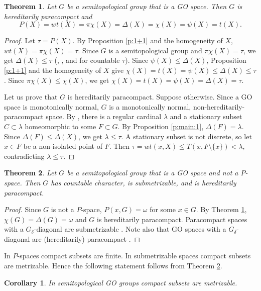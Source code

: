 \documentclass[preprint]{elsarticle}
\def\om{\omega}
\def\la{\lambda}
\def\de{\delta}
\def\sset#1{\{#1\}}
\def\D{\Delta}
\newtheorem{theorem}{Theorem}[section]
\newtheorem{cor}{Corollary}[section]
\theoremstyle{definition}
\theoremstyle{remark}
\begin{document}
\begin{theorem}\label{t:main:1+1}
Let $G$ be a semitopological group that is a GO space.
Then $G$ is hereditarily paracompact and
\[
P(X) = wt(X)= \pi\chi(X) = \D(X) =
\chi(X) = \psi(X) = t(X).
\]
\end{theorem}
\begin{proof}
Let $\tau=P(X)$. By Proposition \ref{p:1+1} and the homogeneity of $X$, $wt(X)= \pi\chi(X) = \tau$.
Since $G$ is a semitopological group and $\pi\chi(X) = \tau$, we get $\D(X)\leq\tau$ (\cite[Theorem 1]{Reznichenko2023-1}, \cite[Theorem 2.4]{arh-rezn2005}, and \cite[Corollary 5.7.5]{at2009} for countable $\tau$). Since $\psi(X)\leq \D(X)$, Proposition \ref{p:1+1} and the homogeneity of $X$ give $\chi(X) = t(X) = \psi(X) \leq \D(X)\leq \tau$. Since $\pi\chi(X)\leq \chi(X)$, we get $\chi(X) = t(X) = \psi(X) = \D(X) = \tau$.

Let us prove that $G$ is hereditarily paracompact. Suppose otherwise. Since a GO space is monotonically normal, $G$ is a monotonically normal, non-hereditarily-paracompact space. By \cite[Theorem I]{BaloghRudin1992}, there is a regular cardinal $\la$ and a stationary subset $C\subset \la$ homeomorphic to some $F\subset G$. By Proposition \ref{p:main:1}, $\D(F)=\la$. Since $\D(F)\leq \D(X)$, we get $\la\leq \tau$. A stationary subset is not discrete, so let $x\in F$ be a non-isolated point of $F$. Then $\tau=wt(x,X)\leq T(x,F\setminus\sset x)<\la$, contradicting $\la\leq \tau$.
\end{proof}


\begin{theorem}\label{t:main:2}
Let $G$ be a semitopological group that is a GO space and not a $P$-space.
Then $G$ has countable character, is submetrizable, and is hereditarily paracompact.
\end{theorem}
\begin{proof}
Since $G$ is not a $P$-space, $P(x,G)=\om$ for some $x\in G$.
By Theorem \ref{t:main:1+1}, $\chi(G)=\D(G)=\om$ and $G$ is hereditarily paracompact.
Paracompact spaces with a $G_\de$-diagonal are submetrizable \cite[Corollary 2.9]{gru1984}.
Note also that GO spaces with a $G_\de$-diagonal are (hereditarily) paracompact \cite[Theorem 4.5]{Lutzer1971}.
\end{proof}

In $P$-spaces compact subsets are finite.
In submetrizable spaces compact subsets are metrizable.
Hence the following statement follows from Theorem \ref{t:main:2}.

\begin{cor}\label{с:main:1}
In semitopological GO groups compact subsets are metrizable.
\end{cor}
\end{document}
